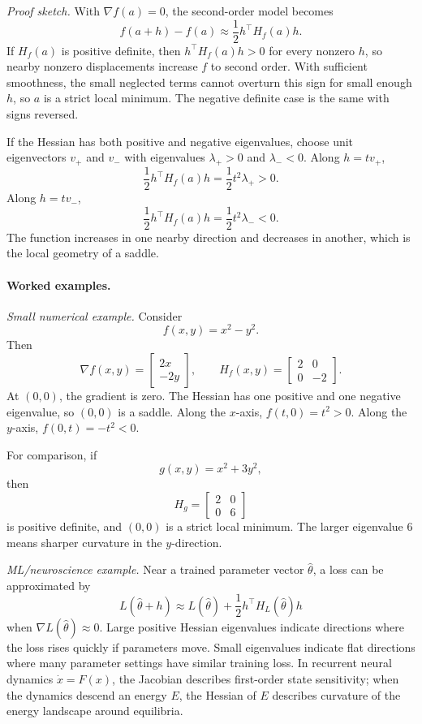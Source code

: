 \emph{Proof sketch.} With \(\nabla f(a)=0\), the second-order model becomes
\[
f(a+h)-f(a)\approx \frac{1}{2}h^\top H_f(a)h.
\]
If \(H_f(a)\) is positive definite, then \(h^\top H_f(a)h>0\) for every nonzero \(h\), so nearby nonzero displacements increase \(f\) to second order. With sufficient smoothness, the small neglected terms cannot overturn this sign for small enough \(h\), so \(a\) is a strict local minimum. The negative definite case is the same with signs reversed.

If the Hessian has both positive and negative eigenvalues, choose unit eigenvectors \(v_+\) and \(v_-\) with eigenvalues \(\lambda_+>0\) and \(\lambda_-<0\). Along \(h=t v_+\),
\[
\frac{1}{2}h^\top H_f(a)h=\frac{1}{2}t^2\lambda_+>0.
\]
Along \(h=t v_-\),
\[
\frac{1}{2}h^\top H_f(a)h=\frac{1}{2}t^2\lambda_-<0.
\]
The function increases in one nearby direction and decreases in another, which is the local geometry of a saddle.

\paragraph{Worked examples.}
\emph{Small numerical example.} Consider
\[
f(x,y)=x^2-y^2.
\]
Then
\[
\nabla f(x,y)=
\begin{bmatrix}
2x\\
-2y
\end{bmatrix},
\qquad
H_f(x,y)=
\begin{bmatrix}
2&0\\
0&-2
\end{bmatrix}.
\]
At \((0,0)\), the gradient is zero. The Hessian has one positive and one negative eigenvalue, so \((0,0)\) is a saddle. Along the \(x\)-axis, \(f(t,0)=t^2>0\). Along the \(y\)-axis, \(f(0,t)=-t^2<0\).

For comparison, if
\[
g(x,y)=x^2+3y^2,
\]
then
\[
H_g=
\begin{bmatrix}
2&0\\
0&6
\end{bmatrix}
\]
is positive definite, and \((0,0)\) is a strict local minimum. The larger eigenvalue \(6\) means sharper curvature in the \(y\)-direction.

\emph{ML/neuroscience example.} Near a trained parameter vector \(\hat{\theta}\), a loss can be approximated by
\[
L(\hat{\theta}+h)\approx L(\hat{\theta})+\frac{1}{2}h^\top H_L(\hat{\theta})h
\]
when \(\nabla L(\hat{\theta})\approx0\). Large positive Hessian eigenvalues indicate directions where the loss rises quickly if parameters move. Small eigenvalues indicate flat directions where many parameter settings have similar training loss. In recurrent neural dynamics \(\dot{x}=F(x)\), the Jacobian describes first-order state sensitivity; when the dynamics descend an energy \(E\), the Hessian of \(E\) describes curvature of the energy landscape around equilibria.

